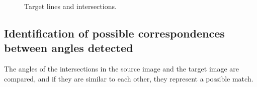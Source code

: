            \begin{figure}[htp]
                \centering
                \caption{Target lines and intersections.}
                \label{fig:target_intersections}
            \end{figure}

        \subsection{Identification of possible correspondences between angles detected}
        \label{sub:Identification of possible correspondences between angles detected}
            The angles of the intersections in the source image and the target image are compared,
            and if they are similar to each other, they represent a possible match.

